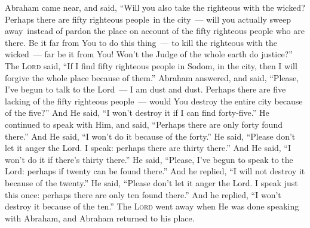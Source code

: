 \begin{inparaenum}
   Abraham came near, and said, ``Will you also take the righteous with the wicked?%
   Perhaps there are fifty righteous people\understood\ in the city~--- will you actually sweep away\understood\ instead of pardon the place on account of the fifty righteous people who are there.%
   Be it far from You to do this thing~--- to kill the righteous with the wicked~--- far be it from You! Won't the Judge of the whole earth do justice?''%
   The \textsc{Lord} said, ``If I find fifty righteous people in Sodom, in the city, then I will forgive the whole place because of them.''%
   Abraham answered, and said, ``Please, I've begun to talk to the Lord~--- I am dust and dust.%
   Perhaps there are five lacking of the fifty righteous people~--- would You destroy the entire city because of the five?'' And He said, ``I won't destroy it if I can find forty-five.''%
   He continued to speak with Him, and said, ``Perhaps there are only forty found there.'' And He said, ``I won't do it because of the forty.''%
   He said, ``Please don't let it anger the Lord. I speak: perhaps there are thirty there.'' And He said, ``I won't do it if there's thirty there.''%
   He said, ``Please, I've begun to speak to the Lord: perhaps if twenty can be found there.'' And he replied, ``I will not destroy it because of the twenty.''%
   He said, ``Please don't let it anger the Lord. I speak just this once: perhaps there are only ten found there.'' And he replied, ``I won't destroy it because of the ten.''%
   The \textsc{Lord} went away when He was done speaking with Abraham, and Abraham returned to his place.%
\end{inparaenum}
